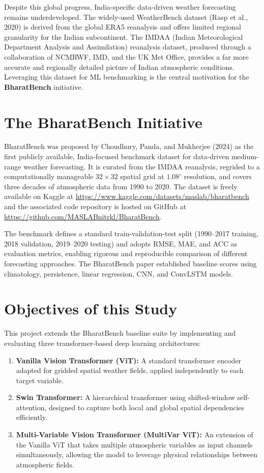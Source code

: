 \documentclass[12pt,a4paper,oneside]{report}
\begin{document}
Despite this global progress, India-specific data-driven weather forecasting remains underdeveloped. The widely-used WeatherBench dataset (Rasp et al., 2020) is derived from the global ERA5 reanalysis and offers limited regional granularity for the Indian subcontinent. The IMDAA (Indian Meteorological Department Analysis and Assimilation) reanalysis dataset, produced through a collaboration of NCMRWF, IMD, and the UK Met Office, provides a far more accurate and regionally detailed picture of Indian atmospheric conditions. Leveraging this dataset for ML benchmarking is the central motivation for the \textbf{BharatBench} initiative.

\section{The BharatBench Initiative}

BharatBench was proposed by Choudhury, Panda, and Mukherjee (2024) as the first publicly available, India-focused benchmark dataset for data-driven medium-range weather forecasting. It is curated from the IMDAA reanalysis, regrided to a computationally manageable $32 \times 32$ spatial grid at $1.08^\circ$ resolution, and covers three decades of atmospheric data from 1990 to 2020. The dataset is freely available on Kaggle at \url{https://www.kaggle.com/datasets/maslab/bharatbench} and the associated code repository is hosted on GitHub at \url{https://github.com/MASLABnitrkl/BharatBench}.

The benchmark defines a standard train-validation-test split (1990--2017 training, 2018 validation, 2019--2020 testing) and adopts RMSE, MAE, and ACC as evaluation metrics, enabling rigorous and reproducible comparison of different forecasting approaches. The BharatBench paper established baseline scores using climatology, persistence, linear regression, CNN, and ConvLSTM models.

\section{Objectives of this Study}

This project extends the BharatBench baseline suite by implementing and evaluating three transformer-based deep learning architectures:
\begin{enumerate}
    \item \textbf{Vanilla Vision Transformer (ViT):} A standard transformer encoder adapted for gridded spatial weather fields, applied independently to each target variable.
    \item \textbf{Swin Transformer:} A hierarchical transformer using shifted-window self-attention, designed to capture both local and global spatial dependencies efficiently.
    \item \textbf{Multi-Variable Vision Transformer (MultiVar ViT):} An extension of the Vanilla ViT that takes multiple atmospheric variables as input channels simultaneously, allowing the model to leverage physical relationships between atmospheric fields.
\end{enumerate}
\end{document}
